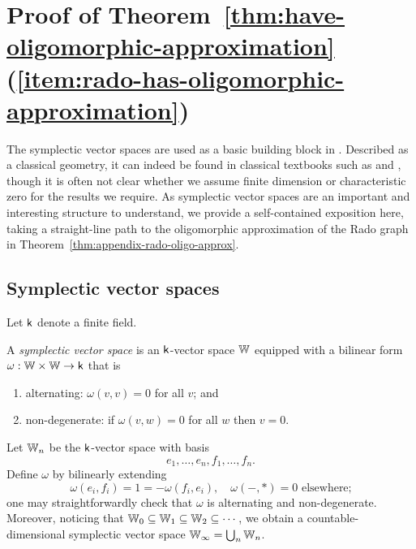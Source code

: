 \section{Proof of Theorem~\ref{thm:have-oligomorphic-approximation}(\ref{item:rado-has-oligomorphic-approximation})}\label{sec:appendix-symplectic}

The symplectic vector spaces are used as a basic building block in \cite{KLM89}.
Described as a classical geometry, it can indeed be found in classical textbooks such as \cite[pp.~114--121]{Artin_symplectic} and \cite[pp.~75--83]{Aschbacher_symplectic},
though it is often not clear whether we assume finite dimension or characteristic zero for the results we require. 
As symplectic vector spaces are an important and interesting structure to understand, we provide a self-contained exposition here, taking a straight-line path to the oligomorphic approximation of the Rado graph in Theorem~\ref{thm:appendix-rado-oligo-approx}.

\subsection{Symplectic vector spaces}
Let $\mathsf{k}$ denote a finite field.
\begin{definition}
    A \emph{symplectic vector space} is an $\mathsf{k}$-vector space $\mathbb{W}$ 
    equipped with a bilinear form $\omega: \mathbb{W} \times \mathbb{W} \to \mathsf{k}$ that is
    \begin{enumerate}
        \item alternating: $\omega(v, v) = 0$ for all $v$; and
        \item non-degenerate: if $\omega(v, w) = 0$ for all $w$ then $v = 0$.
    \end{enumerate}
\end{definition}

\begin{myexample}
    Let $\mathbb{W}_n$ be the $\mathsf{k}$-vector space with basis \[e_1  , \ldots, e_n, f_1, \ldots, f_n.\]
    Define $\omega$ by bilinearly extending
    \begin{equation}\label{eq:symplectic-basis}
        \omega(e_i, f_i) = 1 = -\omega(f_i, e_i),\quad
        \omega(-, *) = 0 \text{ elsewhere;}
        \tag{$\ddagger$}
    \end{equation}
    one may straightforwardly check that $\omega$ is alternating and non-degenerate.
    Moreover, noticing that $\mathbb{W}_0 \subseteq \mathbb{W}_1 \subseteq \mathbb{W}_2 \subseteq \cdots$,
    we obtain a countable-dimensional symplectic vector space $\mathbb{W}_\infty = \bigcup_n \mathbb{W}_n$.
\end{myexample}

